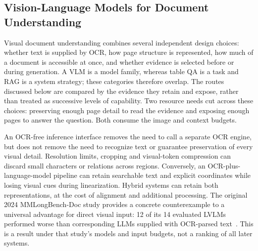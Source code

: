 \subsection{Vision-Language Models for Document Understanding}
Visual document understanding combines several independent design choices: whether text is supplied by OCR, how page structure is represented, how much of a document is accessible at once, and whether evidence is selected before or during generation. A VLM is a model family, whereas table QA is a task and RAG is a system strategy; these categories therefore overlap. The routes discussed below are compared by the evidence they retain and expose, rather than treated as successive levels of capability. Two resource needs cut across these choices: preserving enough page detail to read the evidence and exposing enough pages to answer the question. Both consume the image and context budgets.

An OCR-free inference interface removes the need to call a separate OCR engine, but does not remove the need to recognize text or guarantee preservation of every visual detail. Resolution limits, cropping and visual-token compression can discard small characters or relations across regions. Conversely, an OCR-plus-language-model pipeline can retain searchable text and explicit coordinates while losing visual cues during linearization. Hybrid systems can retain both representations, at the cost of alignment and additional processing. The original 2024 MMLongBench-Doc study provides a concrete counterexample to a universal advantage for direct visual input: 12 of its 14 evaluated LVLMs performed worse than corresponding LLMs supplied with OCR-parsed text~\cite{mmlongbenchdoc2024}. This is a result under that study's models and input budgets, not a ranking of all later systems.

